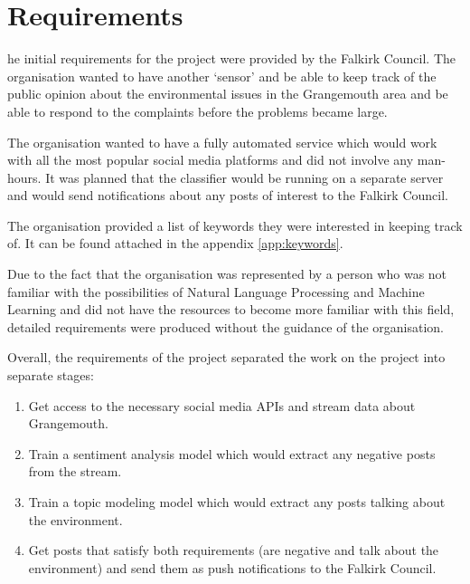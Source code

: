 \let\textcircled=\pgftextcircled
\chapter{Requirements}
\label{chap:requirements}

he initial requirements for the project were provided by the Falkirk Council. The organisation wanted to have another `sensor' and be able to keep track of the public opinion about the environmental issues in the Grangemouth area and be able to respond to the complaints before the problems became large. 

The organisation wanted to have a fully automated service which would work with all the most popular social media platforms and did not involve any man-hours. It was planned that the classifier would be running on a separate server and would send notifications about any posts of interest to the Falkirk Council.

The organisation provided a list of keywords they were interested in keeping track of. It can be found attached in the appendix \ref{app:keywords}.

Due to the fact that the organisation was represented by a person who was not familiar with the possibilities of Natural Language Processing and Machine Learning and did not have the resources to become more familiar with this field, detailed requirements were produced without the guidance of the organisation. 

Overall, the requirements of the project separated the work on the project into separate stages:

\begin{enumerate}
    \item Get access to the necessary social media APIs and stream data about Grangemouth.
    \item Train a sentiment analysis model which would extract any negative posts from the stream.
    \item Train a topic modeling model which would extract any posts talking about the environment.
    \item Get posts that satisfy both requirements (are negative and talk about the environment) and send them as push notifications to the Falkirk Council.
\end{enumerate} 

